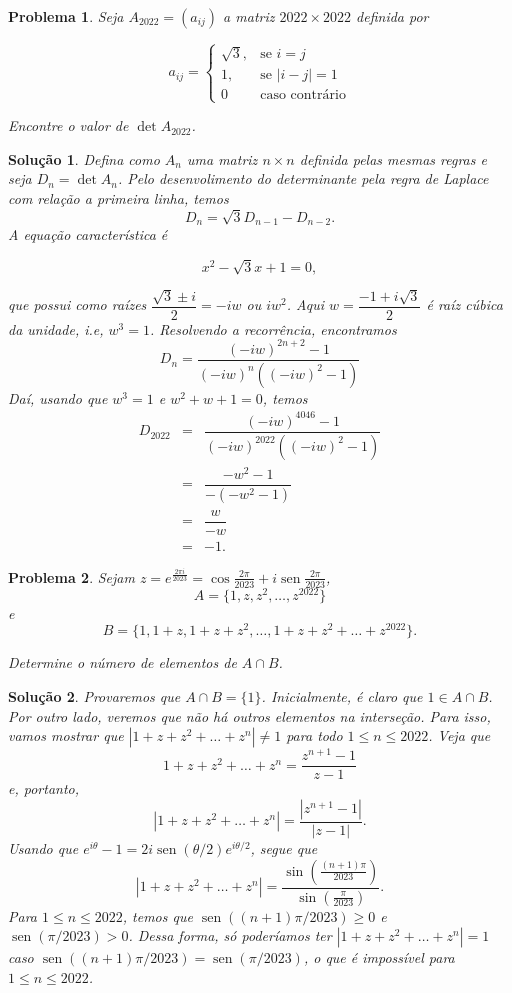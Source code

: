 \documentclass{hipatia}
\DeclareMathOperator{\sen}{sen}
\newtheorem{problem*}{Problema}
\newtheorem*{solution*}{Solução}
\begin{document}
\begin{problem*}
Seja $A_{2022} = (a_{ij})$ a matriz $2022 \times 2022$ definida por 

$$a_{ij} = \left \{ \begin{array}{cl} \sqrt{3}, & \text{se}\,\,i=j \\1, & \text{se}\,\,|i-j|=1 \\ 0 & \text{caso contrário} \end{array} \right .$$

\noindent Encontre o valor de  $\det A_{2022}$.

\end{problem*}

\begin{solution*}
Defina como $A_n$ uma matriz $n \times n $ definida pelas mesmas regras e seja $D_n = \det A_n$. Pelo desenvolimento do determinante pela regra de Laplace com relação a primeira linha, temos 
$$ D_n = \sqrt{3}D_{n-1}-D_{n-2}.$$
A equação característica é 

$$x^2-\sqrt{3}x+1=0,$$

\noindent que possui como raízes $\dfrac{\sqrt{3}\pm i}{2} = -iw$ ou $iw^2$. Aqui $w=\dfrac{-1+i\sqrt{3}}{2}$ é raíz cúbica da unidade, i.e, $w^3=1$. Resolvendo a recorrência, encontramos
$$D_n = \dfrac{(-iw)^{2n+2}-1}{(-iw)^n((-iw)^2-1)}$$
Daí, usando que $w^3=1$ e $w^2+w+1=0$, temos 
\begin{eqnarray*}
D_{2022} & = & \dfrac{(-iw)^{4046}-1}{(-iw)^{2022}((-iw)^2-1)} \\
         & = & \dfrac{-w^2-1}{-(-w^2-1)} \\
         & = & \dfrac{w}{-w} \\
         & = & -1.
\end{eqnarray*}
\end{solution*}


\begin{problem*}
Sejam $z = e^{\frac{2\pi i}{2023}} = \cos \frac{2\pi}{2023} + i\sen \frac{2\pi}{2023} $,
$$A = \{1, z, z^2, \ldots, z^{2022} \}$$
e
$$B = \{1, 1+z, 1+z+z^2, \ldots, 1+z+z^2+ \ldots+ z^{2022} \}.$$

\noindent Determine o número de elementos de $A \cap B$.
\end{problem*}

\begin{solution*}
Provaremos que $A \cap B = \{1\}$. Inicialmente, é claro que $1 \in A \cap B$. Por outro lado, veremos que não há outros elementos na interseção. Para isso, vamos mostrar que $|1 + z + z^2 + \ldots + z^n| \neq 1$ para todo $1 \le n \le 2022$. Veja que
\[
1 + z + z^2 + \ldots + z^n = \frac{z^{n+1}-1}{z-1}
\]
e, portanto,
\[
|1 + z + z^2 + \ldots + z^n| = \frac{|z^{n+1}-1|}{|z-1|}.
\]
Usando que $e^{i\theta}-1 = 2i \sen(\theta/2)e^{i\theta/2}$, segue que
\[
|1 + z + z^2 + \ldots + z^n| = \frac{\sin\left(\frac{(n+1)\pi}{2023}\right)}{\sin\left(\frac{\pi}{2023}\right)}.
\]
Para $1 \le n \le 2022$, temos que $\sen((n+1)\pi/2023) \ge 0$ e $\sen(\pi/2023) > 0$. Dessa forma, só poderíamos ter $|1 + z + z^2 + \ldots + z^n| = 1$ caso $\sen((n+1)\pi/2023) = \sen(\pi/2023)$, o que é impossível para $1 \le n \le 2022$.
\end{solution*}
\end{document}
